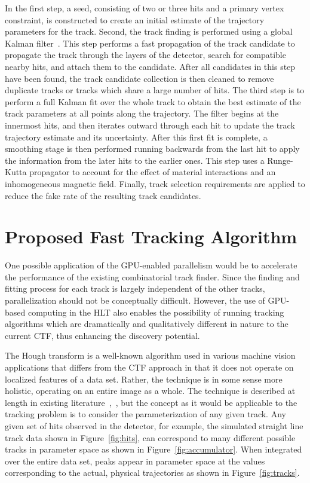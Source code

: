 \documentclass{JINST}
\begin{document}
In the first step, a seed, consisting of two or three hits and a primary vertex constraint,
is constructed to create an initial estimate of the trajectory parameters for the track. Second, the
track finding is performed using a global Kalman filter~\cite{Fruhwirth:1987fm}. This step performs a fast
propagation of the track candidate to propagate the track through the layers of the detector, search for
compatible nearby hits, and attach them to the candidate. After all candidates in this step have been
found, the track candidate collection is then cleaned to remove duplicate tracks or tracks which share a
large number of hits.  The third step is to perform a full Kalman fit over the whole track to obtain the
best estimate of the track parameters at all points along the trajectory. The filter begins at the
innermost hits, and then iterates outward through each hit to update the track trajectory estimate and
its uncertainty. After this first fit is complete, a smoothing stage is then performed running backwards
from the last hit to apply the information from the later hits to the earlier ones. This step uses a
Runge-Kutta propagator to account for the effect of material interactions and an inhomogeneous magnetic
field. Finally, track selection requirements are applied to reduce the fake rate of the resulting track
candidates.



\section{Proposed Fast Tracking Algorithm}

One possible application of the GPU-enabled parallelism would be to accelerate the performance of the
existing combinatorial track finder.  Since the finding and fitting process for each track is largely
independent of the other tracks, parallelization should not be conceptually difficult.  However, the use
of GPU-based computing in the HLT also enables the possibility of running tracking algorithms which are
dramatically and qualitatively different in nature to the current CTF, thus enhancing the discovery potential.

 The Hough transform is a well-known algorithm used in various machine
vision applications that differs from the CTF approach in that it does not operate on
localized features of a data set.  Rather, the technique is in some sense more
holistic, operating on an entire image as a whole. 
The technique is described at length in existing literature~\cite{bib:HT1},~\cite{bib:HT2},
but the concept as it would be applicable to the
tracking problem is to consider the parameterization of any given track.  Any given set of hits
observed in the detector, for example, the simulated straight line track data shown in Figure~\ref{fig:hits},
can correspond to many different possible tracks in parameter space as shown in Figure~\ref{fig:accumulator}.
When integrated over the entire data set, peaks appear in parameter space at the values corresponding to the actual, 
physical trajectories as shown in Figure~\ref{fig:tracks}.
\end{document}
